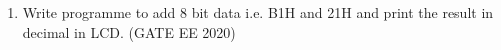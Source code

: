 \begin{enumerate}
\item Write programme to add 8 bit data i.e. B1H and 21H and print the result in decimal in LCD.
\hfill(GATE EE 2020)
\end{enumerate}
